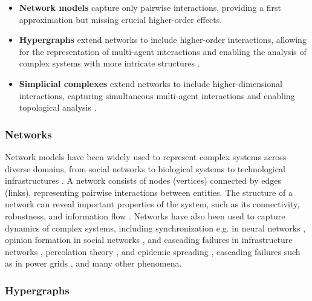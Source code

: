 \begin{itemize}[leftmargin=*]
  \item \textbf{Network models} capture only pairwise interactions, providing a first approximation but missing crucial higher-order effects.

  \item \textbf{Hypergraphs} extend networks to include higher-order interactions, allowing for the representation of multi-agent interactions and enabling the analysis of complex systems with more intricate structures \citep{benson2016higher, battiston2020networks}.

  \item \textbf{Simplicial complexes} extend networks to include higher-dimensional interactions, capturing simultaneous multi-agent interactions and enabling topological analysis \citep{battiston2020networks, petri2014homological}.
\end{itemize}

\subsubsection{Networks}

Network models have been widely used to represent complex systems across diverse domains, from social networks to biological systems to technological infrastructures \citep{boccaletti2006complex, newman2003structure}. A network consists of nodes (vertices) connected by edges (links), representing pairwise interactions between entities. The structure of a network can reveal important properties of the system, such as its connectivity, robustness, and information flow \citep{barabasi2004network}. Networks have also been used to capture dynamics of complex systems, including synchronization e.g. in neural networks \citep{arenas2008synchronization}, opinion formation in social networks \citep{castellano2009statistical}, and cascading failures in infrastructure networks \citep{watts2002simple}, percolation theory \citep{cohen2010complex}, and epidemic spreading \citep{pastor2015epidemic}, cascading failures such as in power grids \citep{dobson2007complex}, and many other phenomena.

\subsubsection{Hypergraphs}

